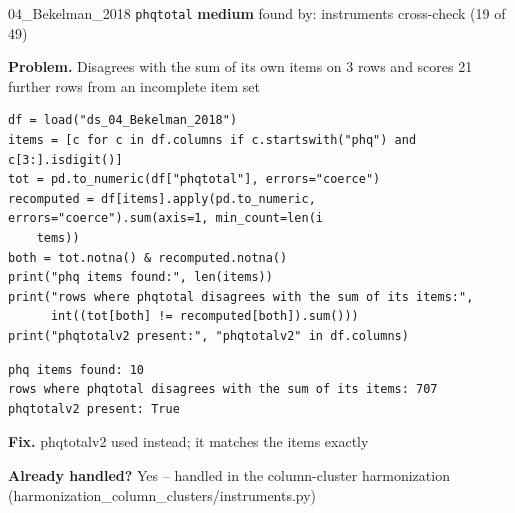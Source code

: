 \documentclass[9pt, t, handout]{beamer}
\newcommand{\ans}[1]{\textcolor{structure.fg}{#1}}
\begin{document}
\begin{frame}[fragile]{04\_Bekelman\_2018 \quad \texttt{phqtotal}}
  {\scriptsize\textcolor{blue!55!black}{\textbf{medium}} \quad
   found by: instruments cross-check \quad (19 of 49)}
  \vspace{3pt}

  {\footnotesize \textbf{Problem.} Disagrees with the sum of its own items on 3 rows and scores 21 further rows from an incomplete item set}
  \vspace{4pt}

  \begin{Verbatim}[fontsize=\tiny, frame=single, framesep=2pt, label=\tiny reproduce]
df = load("ds_04_Bekelman_2018")
items = [c for c in df.columns if c.startswith("phq") and c[3:].isdigit()]
tot = pd.to_numeric(df["phqtotal"], errors="coerce")
recomputed = df[items].apply(pd.to_numeric, errors="coerce").sum(axis=1, min_count=len(i
    tems))
both = tot.notna() & recomputed.notna()
print("phq items found:", len(items))
print("rows where phqtotal disagrees with the sum of its items:",
      int((tot[both] != recomputed[both]).sum()))
print("phqtotalv2 present:", "phqtotalv2" in df.columns)
  \end{Verbatim}
  \begin{Verbatim}[fontsize=\tiny, frame=single, framesep=2pt, label=\tiny output]
phq items found: 10
rows where phqtotal disagrees with the sum of its items: 707
phqtotalv2 present: True
  \end{Verbatim}
  \vspace{2pt}

  {\footnotesize \textbf{Fix.} phqtotalv2 used instead; it matches the items exactly}
  \vspace{2pt}

  {\footnotesize \textbf{Already handled?} \ans{Yes} -- handled in the column-cluster harmonization
   (harmonization\_column\_clusters/instruments.py)}
\end{frame}
\end{document}
